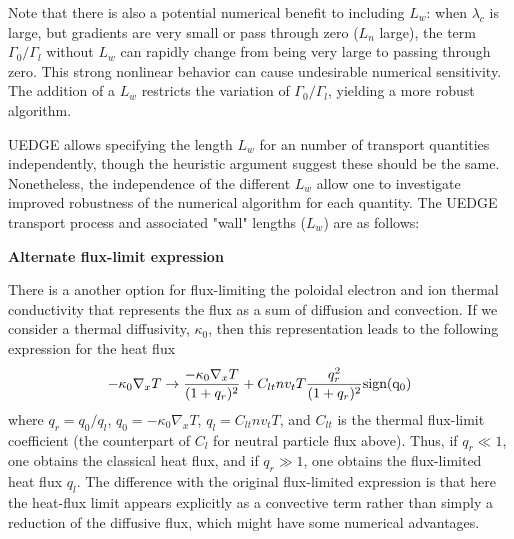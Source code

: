 \documentclass [12pt]{article}
\def\hsa{\hskip.4truein}
\def\hsp6{\hskip.6truein}
\begin{document}
Note that there is also a potential numerical benefit to including
$L_w$: when $\lambda_c$ is large, but gradients are very small or pass
through zero ($L_n$ large), the term $\Gamma_0 / \Gamma_l$ without
$L_w$ can rapidly change from being very large to passing through
zero.  This strong nonlinear behavior can cause undesirable numerical
sensitivity.  The addition of a $L_w$ restricts the variation of
$\Gamma_0/\Gamma_l$, yielding a more robust algorithm.

UEDGE allows specifying the length $L_w$ for an number of transport
quantities independently, though the heuristic argument suggest these
should be the same.  Nonetheless, the independence of the different
$L_w$ allow one to investigate improved robustness of the numerical
algorithm for each quantity.  The UEDGE transport process and
associated "wall" lengths ($L_w$) are as follows:

{\sf
{}
}

\noindent
{\bf Alternate flux-limit expression}

There is a another option for flux-limiting the poloidal electron and
ion thermal conductivity that represents the flux as a sum of
diffusion and convection.  If we consider a thermal diffusivity,
$\kappa_0$, then this representation leads to the following expression
for the heat flux
\begin{equation}
   -\kappa_0 \nabla_x T \rightarrow \frac{-\kappa_0 \nabla_x T}
                                 {(1 + q_r)^2} + C_{lt} nv_t T
                     \frac{q_r^2}{(1 +  q_r)^2} {\rm sign(q_0)}
\end{equation}
where $q_r = q_0/q_l$, $q_0 = -\kappa_0 \nabla_x T$, $q_l = C_{lt} n
v_t T$, and $C_{lt}$ is the thermal flux-limit coefficient (the
counterpart of $C_l$ for neutral particle flux above).  Thus, if $q_r
\ll 1$, one obtains the classical heat flux, and if $q_r \gg 1$, one
obtains the flux-limited heat flux $q_l$.  The difference with the
original flux-limited expression is that here the heat-flux limit
appears explicitly as a convective term rather than simply a reduction
of the diffusive flux, which might have some numerical advantages.
\end{document}
